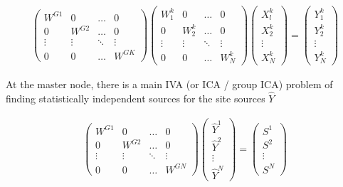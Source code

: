 \documentclass{amsproc}
\begin{document}
\begin{align} \label{site_specific}
    \begin{pmatrix}
        W^{G1}  & 0         & \dots     & 0         \\
        0       & W^{G2}    & \dots     & 0         \\
        \vdots  & \vdots    & \ddots    & \vdots    \\
        0       & 0         & \dots     & W^{GK}
    \end{pmatrix}
    \begin{pmatrix}
        W^k_1   & 0         & \dots     & 0         \\
        0       & W^k_2     & \dots     & 0         \\
        \vdots  & \vdots    & \ddots    & \vdots    \\
        0       & 0         & \dots     & W^k_N
    \end{pmatrix}
    \begin{pmatrix}
        X^k_l   \\
        X^k_2   \\
        \vdots  \\
        X^k_N
    \end{pmatrix}
    =
    \begin{pmatrix}
        Y^k_1   \\
        Y^k_2   \\
        \vdots  \\
        Y^k_N
    \end{pmatrix}
\end{align} 

At the master node, there is a main IVA (or ICA / group ICA) problem of finding statistically independent sources for the site sources $\hat{Y}$
        
\begin{align} \label{global}
    \begin{pmatrix}
        W^{G1}  & 0         & \dots     & 0         \\
        0       & W^{G2}    & \dots     & 0         \\
        \vdots  & \vdots    & \ddots    & \vdots    \\
        0       & 0         & \dots     & W^{GN}
    \end{pmatrix}
    \begin{pmatrix}
        \hat{Y}^1   \\
        \hat{Y}^2   \\
        \vdots      \\
        \hat{Y}^N
    \end{pmatrix}
    =
    \begin{pmatrix}
        S^1     \\
        S^2     \\
        \vdots  \\
        S^N
    \end{pmatrix}
\end{align}
\end{document}
